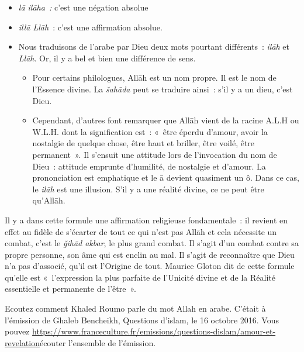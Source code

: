 \begin{itemize}
\item
  \emph{lā ilāha~:} c'est une négation absolue
\item
  \emph{illā Llāh}~: c'est une affirmation absolue.
\item
  Nous traduisons de l'arabe par Dieu deux mots pourtant différents~:
  \emph{ilāh} et \emph{Llāh}. Or, il y a bel et bien une différence de
  sens.

  \begin{itemize}
  \item
    Pour certains philologues, Allāh est un nom propre. Il est le nom de
    l'Essence divine. La \emph{šahāda} peut se traduire ainsi~: s'il y a
    un dieu, c'est Dieu.
  \item
    Cependant, d'autres font remarquer que Allāh vient de la racine
    A.L.H ou W.L.H. dont la signification est~: «~être éperdu d'amour,
    avoir la nostalgie de quelque chose, être haut et briller, être
    voilé, être permanent~». Il s'ensuit une attitude lors de
    l'invocation du nom de Dieu~: attitude emprunte d'humilité, de
    nostalgie et d'amour. La prononciation est emphatique et le ā
    devient quasiment un ô. Dans ce cas, le \emph{ilāh} est une
    illusion. S'il y a une réalité divine, ce ne peut être qu'Allāh.
  \end{itemize}
\end{itemize}

Il y a dans cette formule une affirmation religieuse fondamentale~: il
revient en effet au fidèle de s'écarter de tout ce qui n'est pas Allāh
et cela nécessite un combat, c'est le \emph{ǧihād akbar}, le plus grand
combat. Il s'agit d'un combat contre sa propre personne, son âme qui est
enclin au mal. Il s'agit de reconnaître que Dieu n'a pas d'associé,
qu'il est l'Origine de tout. Maurice Gloton dit de cette formule qu'elle
est «~l'expression la plus parfaite de l'Unicité divine et de la Réalité
essentielle et permanente de l'être~».

Ecoutez comment Khaled Roumo parle du mot Allah en arabe. C'était à
l'émission de Ghaleb Bencheikh, Questions d'islam, le 16 octobre 2016.
Vous pouvez
\url{https://www.franceculture.fr/emissions/questions-dislam/amour-et-revelation}{écouter}
l'ensemble de l'émission.


